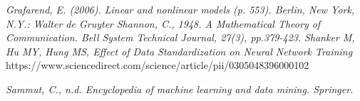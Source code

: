 \documentclass[11pt]{article}
\begin{document}
		 
		
	
	\pagebreak
	\begin{thebibliography}{1}	
		\textit{Grafarend, E. (2006). Linear and nonlinear models (p. 553). Berlin, New York, N.Y.: Walter de Gruyter}
		\textit{Shannon, C., 1948. A Mathematical Theory of Communication. Bell System Technical Journal, 27(3), pp.379-423.}
		\textit{Shanker M, Hu MY, Hung MS, Effect of Data Standardization on Neural Network Training} https://www.sciencedirect.com/science/article/pii/0305048396000102
		
		\textit{Sammut, C., n.d. Encyclopedia of machine learning and data mining. Springer.}
		
		
		
	\end{thebibliography}
\end{document}
